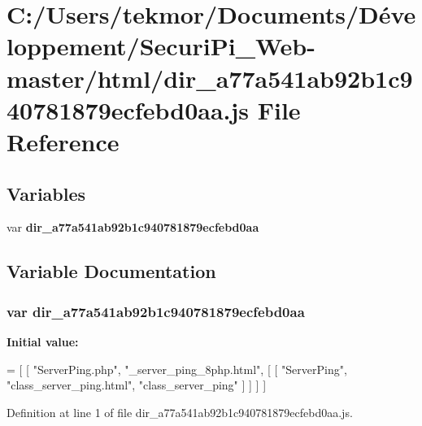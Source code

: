 \section{C\+:/\+Users/tekmor/\+Documents/\+Développement/\+Securi\+Pi\+\_\+\+Web-\/master/html/dir\+\_\+a77a541ab92b1c940781879ecfebd0aa.js File Reference}
\label{dir__a77a541ab92b1c940781879ecfebd0aa_8js}
\subsection*{Variables}
\begin{DoxyCompactItemize}
\item 
var {\bf dir\+\_\+a77a541ab92b1c940781879ecfebd0aa}
\end{DoxyCompactItemize}


\subsection{Variable Documentation}
\subsubsection[{dir\+\_\+a77a541ab92b1c940781879ecfebd0aa}]{\setlength{\rightskip}{0pt plus 5cm}var dir\+\_\+a77a541ab92b1c940781879ecfebd0aa}\label{dir__a77a541ab92b1c940781879ecfebd0aa_8js_a1649432a96a53ce316915ab851416e37}
{\bfseries Initial value\+:}
\begin{DoxyCode}
=
[
    [ \textcolor{stringliteral}{"ServerPing.php"}, \textcolor{stringliteral}{"\_server\_ping\_8php.html"}, [
      [ \textcolor{stringliteral}{"ServerPing"}, \textcolor{stringliteral}{"class\_server\_ping.html"}, \textcolor{stringliteral}{"class\_server\_ping"} ]
    ] ]
]
\end{DoxyCode}


Definition at line 1 of file dir\+\_\+a77a541ab92b1c940781879ecfebd0aa.\+js.

